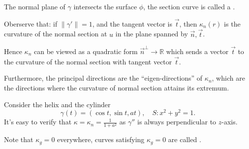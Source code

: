 The normal plane of $\gamma$ intersects the surface  $\phi$, the section curve
is called a .

Oberserve that: if $ \lVert \gamma' \rVert = 1$, and the tangent vector is $\vec{t}$,
then $\kappa_n(r)$ is the curvature of the normal section at $u$ in the plane
spanned by $\vec{n},\vec{t}$.

Hence $\kappa_n$ can be viewed as a quadratic form $\vec{n}^\perp \to \mathbb{R}$ which
sends a vector $\vec{t}$ to the curvature of the normal section with
tangent vector $\vec{t}$.

Furthermore, the principal directions are the ``eigen-directions'' of $\kappa_n$,
which are the directions where the curvature of normal section attains
its extremum.

 \begin{example}
    Consider the helix and the cylinder
	\[
	\gamma(t)=(\cos t, \sin t, at),\quad S : x^2+y^2=1.
	\]
	It's easy to verify that $\kappa=\kappa_n=\frac{1}{1+a^2}$
	as $\gamma''$ is always perpendicular to $z$-axis.

	Note that $\kappa_g = 0$ everywhere, curves satisfying  $\kappa_g=0$ are
	called .
\end{example}
